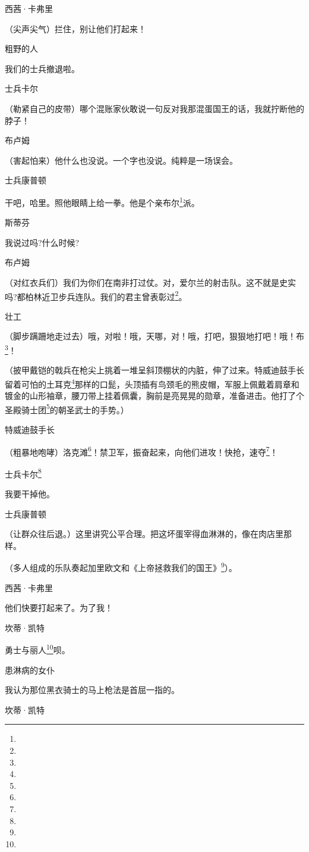 \par 西茜·卡弗里
\par （尖声尖气）拦住，别让他们打起来！
\par 粗野的人
\par 我们的士兵撤退啦。
\par 士兵卡尔
\par （勒紧自己的皮带）哪个混账家伙敢说一句反对我那混蛋国王的话，我就拧断他的脖子！
\par 布卢姆
\par （害起怕来）他什么也没说。一个字也没说。纯粹是一场误会。
\par 士兵康普顿
\par 干吧，哈里。照他眼睛上给一拳。他是个亲布尔\footnote{}派。
\par 斯蒂芬
\par 我说过吗?什么时候?
\par 布卢姆
\par （对红衣兵们）我们为你们在南非打过仗。对，爱尔兰的射击队。这不就是史实吗?都柏林近卫步兵连队。我们的君主曾表彰过\footnote{}。
\par 壮工
\par （脚步蹒跚地走过去）哦，对啦！哦，天哪，对！哦，打吧，狠狠地打吧！哦！布\footnote{}！
\par （披甲戴铠的戟兵在枪尖上挑着一堆呈斜顶棚状的内脏，伸了过来。特威迪鼓手长留着可怕的土耳克\footnote{}那样的口髭，头顶插有鸟颈毛的熊皮帽，军服上佩戴着肩章和镀金的山形袖章，腰刀带上挂着佩囊，胸前是亮晃晃的勋章，准备进击。他打了个圣殿骑士团\footnote{}的朝圣武士的手势。）
\par 特威迪鼓手长
\par （粗暴地咆哮）洛克滩\footnote{}！禁卫军，振奋起来，向他们进攻！快抢，速夺\footnote{}！
\par 士兵卡尔\footnote{}
\par 我要干掉他。
\par 士兵康普顿
\par （让群众往后退。）这里讲究公平合理。把这坏蛋宰得血淋淋的，像在肉店里那样。
\par （多人组成的乐队奏起加里欧文和《上帝拯救我们的国王》\footnote{}）。
\par 西茜·卡弗里
\par 他们快要打起来了。为了我！
\par 坎蒂·凯特
\par 勇士与丽人\footnote{}呗。
\par 患淋病的女仆
\par 我认为那位黑衣骑士的马上枪法是首屈一指的。
\par 坎蒂·凯特
